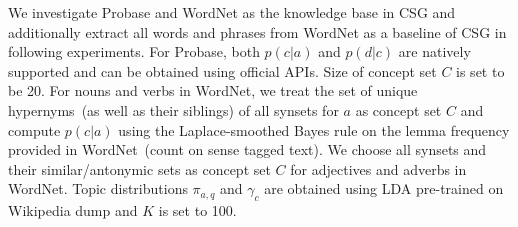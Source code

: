 

We investigate Probase and WordNet as the knowledge base in CSG and additionally extract all words and phrases from WordNet as a baseline of CSG in following experiments. For Probase, both $p(c|a)$ and $p(d|c)$ are natively supported and can be obtained using official APIs. Size of concept set $C$ is set to be 20. For nouns and verbs in WordNet, we treat the set of unique hypernyms~(as well as their siblings) of all synsets for $a$ as concept set $C$ and compute
$p(c|a)$ using the Laplace-smoothed Bayes rule on the lemma frequency provided in WordNet~(count on sense tagged text). We choose all synsets and their similar/antonymic sets as concept set $C$ for adjectives and adverbs in WordNet. Topic distributions $\pi_{a,q}$ and $\gamma_c$ are obtained using LDA pre-trained on Wikipedia dump and $K$ is set to 100.

